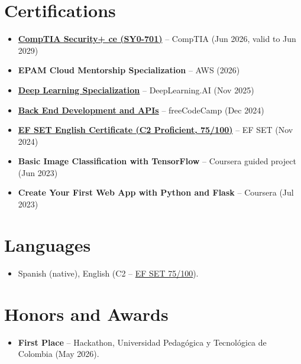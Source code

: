\documentclass[11pt,a4paper,sans]{moderncv}
\begin{document}
\section{Certifications}
\vspace{1pt}
\begin{itemize}
\item{\textbf{\href{https://www.credly.com/badges/485adf76-e28e-4540-8a77-276ecb24b6d0/linked_in_profile}{CompTIA Security+ ce (SY0-701)}} -- CompTIA (Jun 2026, valid to Jun 2029)}
\item{\textbf{EPAM Cloud Mentorship Specialization} -- AWS (2026)}
\item{\textbf{\href{https://www.coursera.org/account/accomplishments/specialization/8HCZD7Y1AMZC}{Deep Learning Specialization}} -- DeepLearning.AI (Nov 2025)}
\item{\textbf{\href{https://www.freecodecamp.org/certification/Pidual/back-end-development-and-apis}{Back End Development and APIs}} -- freeCodeCamp (Dec 2024)}
\item{\textbf{\href{https://cert.efset.org/en/hzQH9H}{EF SET English Certificate (C2 Proficient, 75/100)}} -- EF SET (Nov 2024)}
\item{\textbf{Basic Image Classification with TensorFlow} -- Coursera guided project (Jun 2023)}
\item{\textbf{Create Your First Web App with Python and Flask} -- Coursera (Jul 2023)}
\end{itemize}


\section{Languages}
\vspace{1pt}
\begin{itemize}
\item {Spanish (native), English (C2 -- \href{https://cert.efset.org/en/hzQH9H}{EF SET 75/100}).}
\end{itemize}


\section{Honors and Awards}
\vspace{1pt}
\begin{itemize}
\item{\textbf{First Place} -- Hackathon, Universidad Pedag\'ogica y Tecnol\'ogica de Colombia (May 2026).}
\end{itemize}
\end{document}
